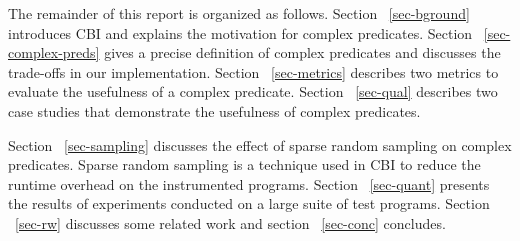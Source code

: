 The remainder of this report is organized as follows.  Section ~\ref{sec-bground} introduces CBI and explains the motivation for complex predicates.  Section ~\ref{sec-complex-preds} gives a precise definition of complex predicates and discusses the trade-offs in our implementation.  Section ~\ref{sec-metrics} describes two metrics to evaluate the usefulness of a complex predicate.  Section ~\ref{sec-qual} describes two case studies that demonstrate the usefulness of complex predicates.  

Section ~\ref{sec-sampling} discusses the effect of sparse random sampling on complex predicates.  Sparse random sampling is a technique used in CBI to reduce the runtime overhead on the instrumented programs.  Section ~\ref{sec-quant} presents the results of experiments conducted on a large suite of test programs.  Section ~\ref{sec-rw} discusses some related work and section ~\ref{sec-conc} concludes.